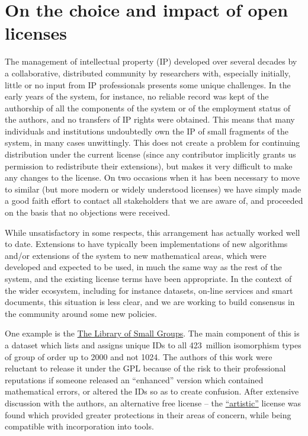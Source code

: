 \documentclass{deliverablereport}
\begin{document}

\section{On the choice and impact of open licenses}



The management of intellectual property (IP) developed over several
decades
by a collaborative, distributed community by researchers with,
especially initially, little or no input from IP professionals
presents some unique challenges. In the early years of the \GAP
system, for instance, no reliable record was kept of the authorship of
all the components of the system or of the employment status of the
authors, and no transfers of IP rights were obtained. This means that
many individuals and institutions undoubtedly own the IP of small
fragments of the system, in many cases unwittingly.
This does not create a problem for continuing
distribution under the current license (since any contributor
implicitly grants us permission to redistribute their
extensions), but makes it very difficult to make any changes to the
license. On two occasions when it has been necessary to move to
similar (but more modern or widely understood licenses) we have simply
made a good faith effort to contact all stakeholders that we are aware
of, and proceeded on the basis that no objections were received.

While unsatisfactory in some respects, this arrangement has actually
worked well to date. Extensions to \GAP have typically been
implementations of new algorithms and/or extensions of the system to
new mathematical areas, which were developed and expected to be used,
in much the same way as the rest of the system, and the existing
license terms have been appropriate. In the context of the wider \ODK
ecosystem, including for instance datasets, on-line services and smart
documents, this situation is less clear, and we are working to build
consensus in the \GAP community around some new policies.

One example is the \href{???}{The Library of Small Groups}. The main
component of this is a dataset which lists and assigns unique IDs to
all 423~million isomorphism types of group of
order up to 2000 and not 1024. The
authors of this work were reluctant to release it under the GPL
because of the risk to their professional reputations if someone
released an ``enhanced'' version which contained mathematical errors,
or altered the IDs so as to create confusion. After extensive
discussion with the authors, an alternative free license -- the
\href{???}{``artistic''} license was found which provided greater
protections in their areas of concern, while being compatible with
incorporation into \ODK tools.
\end{document}
